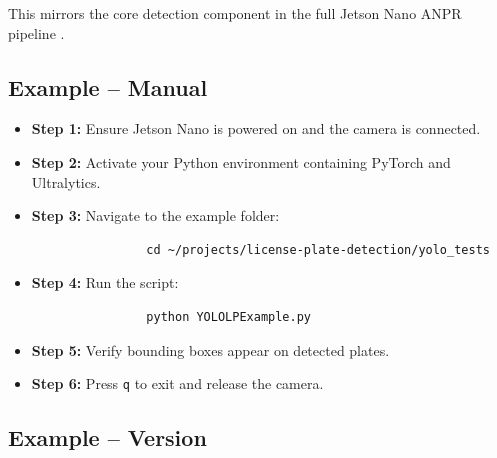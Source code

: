 This mirrors the core detection component in the full Jetson Nano ANPR pipeline \cite{yolo_alpr_end2end_rg}.

\subsection{Example -- Manual}

\begin{itemize}
	\item \textbf{Step 1:} Ensure Jetson Nano is powered on and the camera is connected.
	\item \textbf{Step 2:} Activate your Python environment containing PyTorch and Ultralytics.
	\item \textbf{Step 3:} Navigate to the example folder:
	\begin{tcolorbox}[colback=white, colframe=black, coltext=ShellColor, sharp corners, boxrule=0.8pt]
		\begin{small}
			\begin{verbatim}
				cd ~/projects/license-plate-detection/yolo_tests
			\end{verbatim}
		\end{small}
	\end{tcolorbox}
	
	\item \textbf{Step 4:} Run the script:
	\begin{tcolorbox}[colback=white, colframe=black, coltext=ShellColor, sharp corners, boxrule=0.8pt]
		\begin{small}
			\begin{verbatim}
				python YOLOLPExample.py
			\end{verbatim}
		\end{small}
	\end{tcolorbox}
	
	\item \textbf{Step 5:} Verify bounding boxes appear on detected plates.
	\item \textbf{Step 6:} Press \texttt{q} to exit and release the camera.
\end{itemize}

\subsection{Example -- Version}

